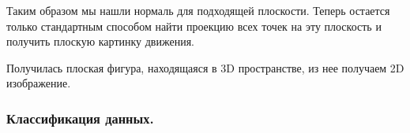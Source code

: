 Таким образом мы нашли нормаль для подходящей плоскости. Теперь остается только стандартным способом найти проекцию всех точек на эту плоскость и получить плоскую картинку движения.
\begin{figure}[H]
\end{figure}
Получилась плоская фигура, находящаяся в 3D пространстве, из нее получаем 2D изображение.
\begin{figure}[H]
\end{figure}
\subsubsection{Классификация данных.}

